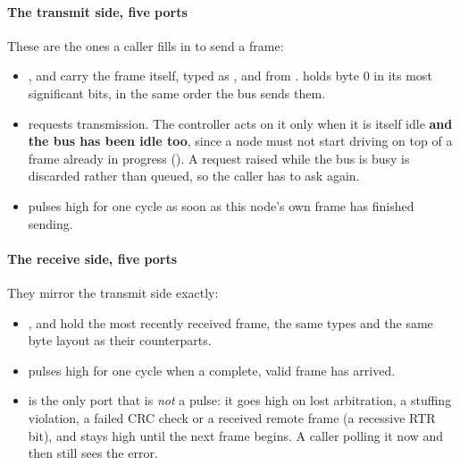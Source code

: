 \paragraph{The transmit side, five ports}
These are the ones a caller fills in to send a frame:
\begin{itemize}
  \item {},  and  carry the frame itself, typed as ,
     and  from .  holds byte 0 in its most
    significant bits, in the same order the bus sends them.
  \item {} requests transmission. The controller acts on it only when it is itself idle
    \textbf{and the bus has been idle too}, since a node must not start driving on top of a frame
    already in progress (). A request raised while the bus is busy is discarded
    rather than queued, so the caller has to ask again.
  \item {} pulses high for one cycle as soon as this node's own frame has finished
    sending.
\end{itemize}

\paragraph{The receive side, five ports}
They mirror the transmit side exactly:
\begin{itemize}
  \item {},  and  hold the most recently received frame, the
    same types and the same byte layout as their  counterparts.
  \item {} pulses high for one cycle when a complete, valid frame has arrived.
  \item {} is the only port that is \emph{not} a pulse: it goes high on lost arbitration, a
    stuffing violation, a failed CRC check or a received remote frame (a recessive RTR bit), and
    stays high until the next frame begins. A caller polling it now and then still sees the error.
\end{itemize}

